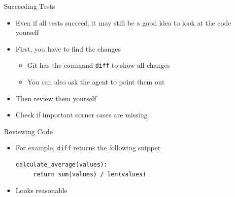 \documentclass[
ps,
]{prosper}
\begin{document}
\begin{slide}{Succeeding Tests}

\begin{itemize}

\item Even if all tests succeed, it may still be a good idea to look at the
  code yourself

\item First, you have to find the changes

  \begin{itemize}
    
  \item Git has the command \texttt{diff} to show all changes
    
  \item You can also ask the agent to point them out
    
  \end{itemize}

\item Then review them yourself

\item Check if important corner cases are missing
  
\end{itemize}
  
\end{slide}



\begin{slide}{Reviewing Code}

\begin{itemize}

\item For example, \texttt{diff} returns the following snippet

\begin{verbatim}
calculate_average(values):
     return sum(values) / len(values)
\end{verbatim}
  
\item Looks reasonable

\end{itemize}
  
\end{slide}
\end{document}
